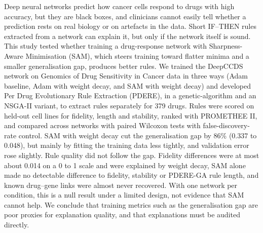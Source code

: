 Deep neural networks predict how cancer cells respond to drugs with high accuracy, but they are black boxes, and clinicians cannot easily tell whether a prediction rests on real biology or on artefacts in the data. Short IF--THEN rules extracted from a network can explain it, but only if the network itself is sound. This study tested whether training a drug-response network with Sharpness-Aware Minimisation (SAM), which steers training toward flatter minima and a smaller generalisation gap, produces better rules. We trained the DeepCCDS network on Genomics of Drug Sensitivity in Cancer data in three ways (Adam baseline, Adam with weight decay, and SAM with weight decay) and developed Per Drug Evolutionary Rule Extraction (PDERE), in a genetic-algorithm and an NSGA-II variant, to extract rules separately for 379 drugs. Rules were scored on held-out cell lines for fidelity, length and stability, ranked with PROMETHEE II, and compared across networks with paired Wilcoxon tests with false-discovery-rate control. SAM with weight decay cut the generalisation gap by 86\% (0.337 to 0.048), but mainly by fitting the training data less tightly, and validation error rose slightly. Rule quality did not follow the gap. Fidelity differences were at most about 0.014 on a 0 to 1 scale and were explained by weight decay, SAM alone made no detectable difference to fidelity, stability or PDERE-GA rule length, and known drug--gene links were almost never recovered. With one network per condition, this is a null result under a limited design, not evidence that SAM cannot help. We conclude that training metrics such as the generalisation gap are poor proxies for explanation quality, and that explanations must be audited directly.